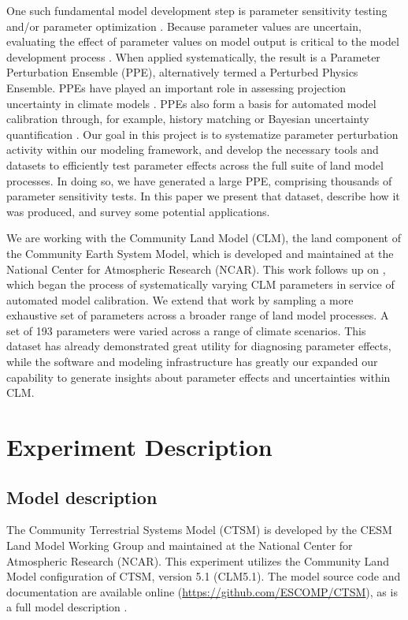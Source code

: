 \documentclass[draft]{agujournal2019}
\begin{document}
One such fundamental model development step is parameter sensitivity testing and/or parameter optimization \cite{qian2018}.
Because parameter values are uncertain, evaluating the effect of parameter values on model output is critical to the model development process \cite{hourdin2017,balaji2022}.
When applied systematically, the result is a Parameter Perturbation Ensemble (PPE), alternatively termed a Perturbed Physics Ensemble.
PPEs have played an important role in assessing projection uncertainty in climate models \cite{murphy2004,sanderson2008,booth2012,hawkins2019,yamazaki2021,peatier2022,tett2022}.
PPEs also form a basis for automated model calibration through, for example, history matching \cite{williamson2013,williamson2017,hourdin2020,couvreux2021} or Bayesian uncertainty quantification \cite{cleary2021}.
Our goal in this project is to systematize parameter perturbation activity within our modeling framework, and develop the necessary tools and datasets to efficiently test parameter effects across the full suite of land model processes. 
In doing so, we have generated a large PPE, comprising thousands of parameter sensitivity tests.
In this paper we present that dataset, describe how it was produced, and survey some potential applications.

We are working with the Community Land Model (CLM), the land component of the Community Earth System Model, which is developed and maintained at the National Center for Atmospheric Research (NCAR).
This work follows up on , which began the process of systematically varying CLM parameters in service of automated model calibration.
We extend that work by sampling a more exhaustive set of parameters across a broader range of land model processes.
A set of 193 parameters were varied across a range of climate scenarios.
This dataset has already demonstrated great utility for diagnosing parameter effects, while the software and modeling infrastructure has greatly our expanded our capability to generate insights about parameter effects and uncertainties within CLM.

\section{Experiment Description}
\label{methods}
\subsection{Model description}
\label{sect:md}
The Community Terrestrial Systems Model (CTSM) is developed by the CESM Land Model Working Group and maintained at the National Center for Atmospheric Research (NCAR). This experiment utilizes the Community Land Model configuration of CTSM, version 5.1 (CLM5.1). The model source code and documentation are available online (\url{https://github.com/ESCOMP/CTSM}), as is a full model description \cite{lawrence2019}.
\end{document}
